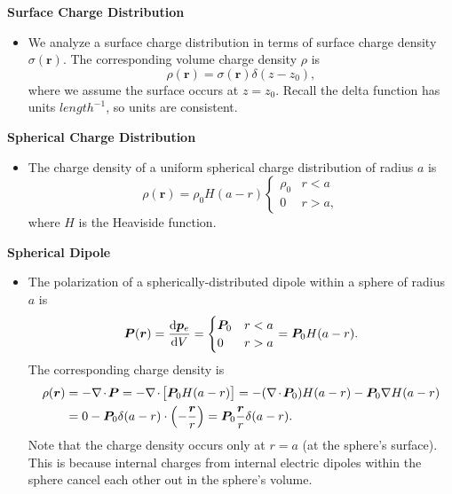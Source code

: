 \documentclass[11pt, a4paper]{article}
\renewcommand{\vec}[1]{\bm{#1}} %
\renewcommand{\r}{\vec{r}}
\newcommand{\pe}{\vec{p}_{e}}  %
\renewcommand{\div}{\nabla \mspace{-2mu} \cdot \mspace{-2mu}}
\renewcommand{\grad}{\nabla}
\begin{document}
\textbf{Surface Charge Distribution}
\begin{itemize}
	\item We analyze a surface charge distribution in terms of surface charge density $ \sigma(\r) $. The corresponding volume charge density $ \rho $ is
	\begin{equation*}
		\rho(\r) = \sigma(\r) \delta(z - z_{0}),
	\end{equation*}
	where we assume the surface occurs at $ z = z_{0} $. Recall the delta function has units $ \si{length}^{-1} $, so units are consistent.
\end{itemize}

\textbf{Spherical Charge Distribution}
\begin{itemize}	
	\item The charge density of a uniform spherical charge distribution of radius $ a $ is
	\begin{equation*}
		\rho(\r) = \rho_{0}H(a - r)
		\begin{cases}
			\rho_{0} & r < a\\
			0 & r > a,
		\end{cases}
	\end{equation*}
	where $ H $ is the Heaviside function.
\end{itemize}
	
\textbf{Spherical Dipole}
\begin{itemize}
	\item The polarization of a spherically-distributed dipole within a sphere of radius $ a $ is 
	\begin{equation*}
		\vec{P}(\r) = \dv{\pe}{V} = 
		\begin{cases}
			\vec{P}_{0} & r < a\\
			0 & r > a
		\end{cases}
		= \vec{P}_{0}H(a - r).
	\end{equation*}
	The corresponding charge density is
	\begin{align*}
		\rho(\r) &= - \div \vec{P} = - \div \big[\vec{P}_{0}H(a - r)\big] = - (\div \vec{P}_{0})H(a - r) - \vec{P}_{0} \grad H(a -r)\\
		&= 0 - \vec{P}_{0} \delta(a-r) \cdot \left (-\frac{\r}{r}\right) = \vec{P}_{0}\frac{\r}{r} \delta(a-r).
	\end{align*}
	Note that the charge density occurs only at $ r = a $ (at the sphere's surface). This is because internal charges from internal electric dipoles within the sphere cancel each other out in the sphere's volume.
\end{itemize}
\end{document}
